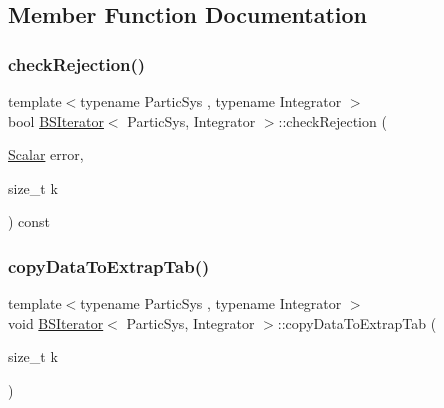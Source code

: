 \subsection{Member Function Documentation}
\mbox{\label{class_b_s_iterator_a42976d786ffe422a86cc5a7b0a077609}} 
\subsubsection{\texorpdfstring{check\+Rejection()}{checkRejection()}}
{\footnotesize\ttfamily template$<$typename Partic\+Sys , typename Integrator $>$ \\
bool \mbox{\hyperlink{class_b_s_iterator}{B\+S\+Iterator}}$<$ Partic\+Sys, Integrator $>$\+::check\+Rejection (\begin{DoxyParamCaption}\item[{\mbox{\hyperlink{class_b_s_iterator_a7857f8ff9032955ea4dcc22cd18ca7a1}{Scalar}}}]{error,  }\item[{size\+\_\+t}]{k }\end{DoxyParamCaption}) const\hspace{0.3cm}{\ttfamily [private]}}

\mbox{\label{class_b_s_iterator_a95c268219a8321af35a628db4e22bec4}} 
\subsubsection{\texorpdfstring{copy\+Data\+To\+Extrap\+Tab()}{copyDataToExtrapTab()}}
{\footnotesize\ttfamily template$<$typename Partic\+Sys , typename Integrator $>$ \\
void \mbox{\hyperlink{class_b_s_iterator}{B\+S\+Iterator}}$<$ Partic\+Sys, Integrator $>$\+::copy\+Data\+To\+Extrap\+Tab (\begin{DoxyParamCaption}\item[{size\+\_\+t}]{k }\end{DoxyParamCaption})\hspace{0.3cm}{\ttfamily [private]}}

\mbox{\label{class_b_s_iterator_ac1edf158e3dd05ed15afd5d0f31c121a}} 
